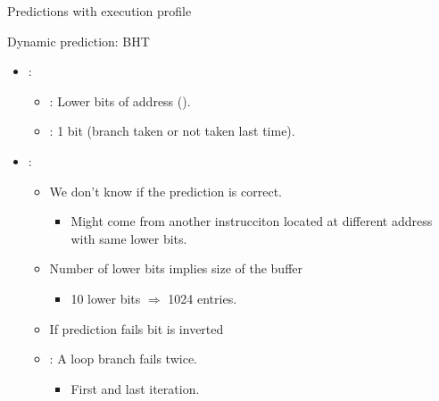 \begin{frame}[t]{Predictions with execution profile}
\end{frame}

\begin{frame}[t]{Dynamic prediction: BHT}
\begin{itemize}
  \item {}:
    \begin{itemize}
      \item {}: Lower bits of address ().
      \item {}: 1 bit (branch taken or not taken last time).
    \end{itemize}
  \item {}:
    \begin{itemize}
      \item We don't know if the prediction is correct.
        \begin{itemize}
          \item Might come from another instrucciton located at different
                address with same lower bits.
        \end{itemize}
        \item Number of lower bits implies size of the buffer
          \begin{itemize}
            \item 10 lower bits $\Rightarrow$ 1024 entries.
          \end{itemize}
        \item If prediction fails bit is inverted
        \item {}: A loop branch fails twice.
          \begin{itemize}
            \item First and last iteration.
          \end{itemize}
    \end{itemize}
\end{itemize}
\end{frame}

